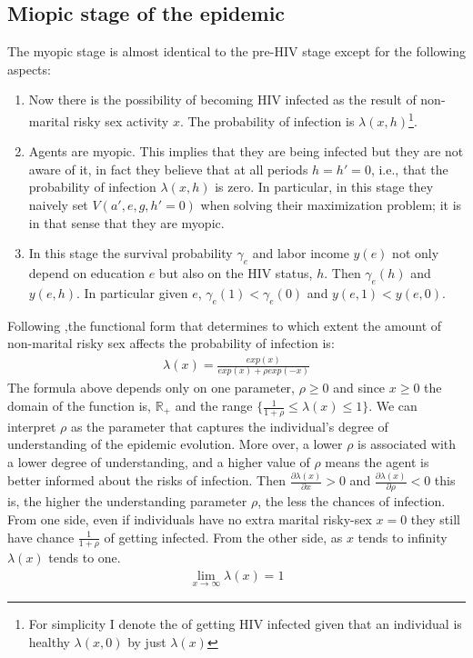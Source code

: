 \subsection{Miopic stage of the epidemic}\label{mio}
The myopic stage is almost identical to the pre-HIV stage except for the following aspects: 
\begin{enumerate}
\item Now there is the possibility of becoming HIV infected as the result of non-marital risky sex activity $x$. The probability of infection is $\lambda(x,h)$\footnote{For simplicity I denote the of getting HIV infected given that an individual is healthy $\lambda(x,0)$ by just $\lambda(x)$ }.
\item Agents are myopic. This implies that they are being infected but they are not aware of it, in fact they believe that at all periods ${h=h'=0}$, i.e., that the probability of infection $\lambda(x,h)$ is zero. In particular,  in this stage they naively set $V(a',e,g,h'=0)$ when solving their maximization problem; it is in that sense that they are myopic. 
\item In this stage the survival probability $\gamma_{e}$ and labor income $y(e)$ not only depend on education $e$ but also on the HIV status, $h$. Then $\gamma_{e}(h)$ and $y(e,h)$. In particular given $e$, $\gamma_{e}(1)<\gamma_{e}(0)$ and $y(e,1)<y(e,0)$.
\end{enumerate}
Following \cite{victor_dos},the functional form that determines to which extent the amount of non-marital risky sex affects the probability of infection is: 
\begin{align*}
\lambda(x)=\frac{exp(x)}{exp(x)+\rho exp(-x)}
\end{align*}
 The formula above depends only on one parameter, $\rho\geq 0$ and since $x\geq 0$ the domain of the function is, $\mathbb{R}_{+}$ and the range $\{\frac{1}{1+\rho}\leq \lambda(x)\leq1\}$. We can interpret $\rho$ as the parameter
that captures the individual's degree of understanding of the epidemic evolution. More over, a lower $\rho$ is associated with a lower degree of understanding, and a higher value of $\rho$ means the agent is better informed about the risks of infection. Then $\frac{\partial\lambda(x)}{\partial x}>0$ and $\frac{\partial\lambda(x)}{\partial \rho}<0$ this is, the higher the understanding parameter $\rho$, the less the chances of infection.\\
From one side, even if individuals have no extra marital risky-sex $x=0$ they still have chance $\frac{1}{1+\rho}$ of getting infected. From the other side, as $x$ tends to infinity $\lambda(x)$ tends to one.
\begin{align*}
\lim_{x\to\infty} \lambda(x)= 1
\end{align*}

